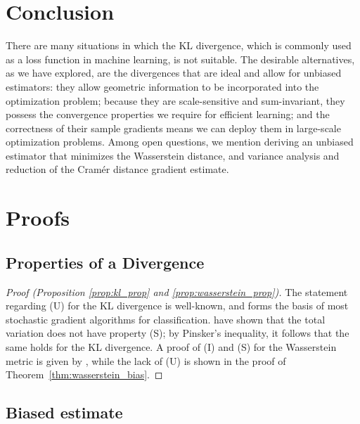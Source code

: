 \documentclass{article}
\begin{document}
\section{Conclusion}
\label{sect:conclusion}
There are many situations in which the KL divergence, which is commonly used as a loss function in machine learning, is not suitable. The desirable alternatives, as we have explored, are the divergences that are ideal and allow for unbiased estimators: they allow geometric information to be incorporated into the optimization problem; because they are scale-sensitive and sum-invariant, they possess the convergence properties we require for efficient learning; and the correctness of their sample gradients means we can deploy them in large-scale optimization problems. Among open questions, we mention deriving an unbiased estimator that minimizes the Wasserstein distance, and variance analysis and reduction of the Cram\'er distance gradient estimate.
%





%
%
%
%
%




\clearpage

\newpage
\appendix

\section{Proofs}


\subsection{Properties of a Divergence}

\begin{proof}[Proof (Proposition \ref{prop:kl_prop} and \ref{prop:wasserstein_prop})]
The statement regarding (U) for the KL divergence is well-known, and forms the basis of most stochastic gradient algorithms for classification. \citet{chung87discounted} have shown that the total variation does not have property (S); by Pinsker's inequality, it follows that the same holds for the KL divergence. A proof of (I) and (S) for the Wasserstein metric is given by \citet{bickel81asymptotic}, while the lack of (U) is shown in the proof of Theorem~\ref{thm:wasserstein_bias}.
\end{proof}

\subsection{Biased estimate}
\end{document}
